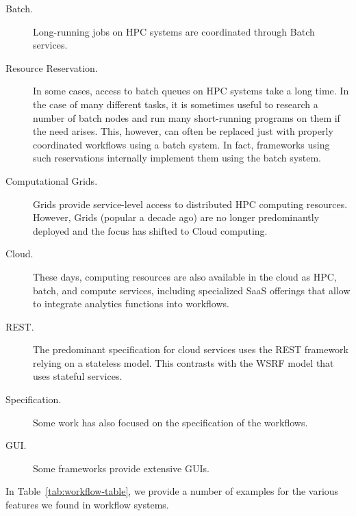 \begin{description}

\item[Batch.] Long-running jobs on HPC systems are coordinated through Batch services.

\item[Resource Reservation.] In some cases, access to batch queues on HPC systems take a long time. In the case of many different tasks, it is sometimes useful to research a number of batch nodes and run many short-running programs on them if the need arises. This, however, can often be replaced just with properly coordinated workflows using a batch system. In fact, frameworks using such reservations internally implement them using the batch system.

\item[Computational Grids.] Grids provide service-level access to distributed HPC computing resources. However, Grids (popular a decade ago) are no longer predominantly deployed and the focus has shifted to Cloud computing.

\item[Cloud.] These days, computing resources are also available in the cloud as HPC, batch, and compute services, including specialized SaaS offerings that allow to integrate analytics functions into workflows.

\item[REST.] The predominant specification for cloud services uses the REST framework relying on a stateless model. This contrasts with the WSRF model that uses stateful services.

\item[Specification.] Some work has also focused on the specification of the workflows.

\item[GUI.] Some frameworks provide extensive GUIs.


\end{description}

In Table~\ref{tab:workflow-table}, we provide a number of examples for the various
features we found in workflow systems.


